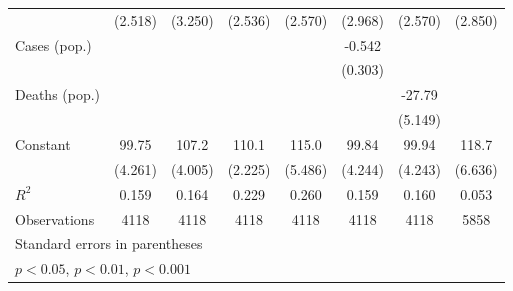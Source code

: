 \documentclass{article}
\begin{document}
{\begin{longtable}{l*{7}{c}}
                &  (2.518)         &  (3.250)         &  (2.536)         &  (2.570)         &  (2.968)         &  (2.570)         &  (2.850)         \\
Cases (pop.)    &                  &                  &                  &                  &   -0.542         &                  &                  \\
                &                  &                  &                  &                  &  (0.303)         &                  &                  \\
Deaths (pop.)   &                  &                  &                  &                  &                  &   -27.79\sym{***}&                  \\
                &                  &                  &                  &                  &                  &  (5.149)         &                  \\
Constant        &    99.75\sym{***}&    107.2\sym{***}&    110.1\sym{***}&    115.0\sym{***}&    99.84\sym{***}&    99.94\sym{***}&    118.7\sym{***}\\
                &  (4.261)         &  (4.005)         &  (2.225)         &  (5.486)         &  (4.244)         &  (4.243)         &  (6.636)         \\
\hline
\(R^{2}\)       &    0.159         &    0.164         &    0.229         &    0.260         &    0.159         &    0.160         &    0.053         \\
Observations    &     4118         &     4118         &     4118         &     4118         &     4118         &     4118         &     5858         \\
\hline\hline
\multicolumn{8}{l}{\footnotesize Standard errors in parentheses}\\
\multicolumn{8}{l}{\footnotesize \sym{*} \(p<0.05\), \sym{**} \(p<0.01\), \sym{***} \(p<0.001\)}\\
\end{longtable}
}
\end{document}

